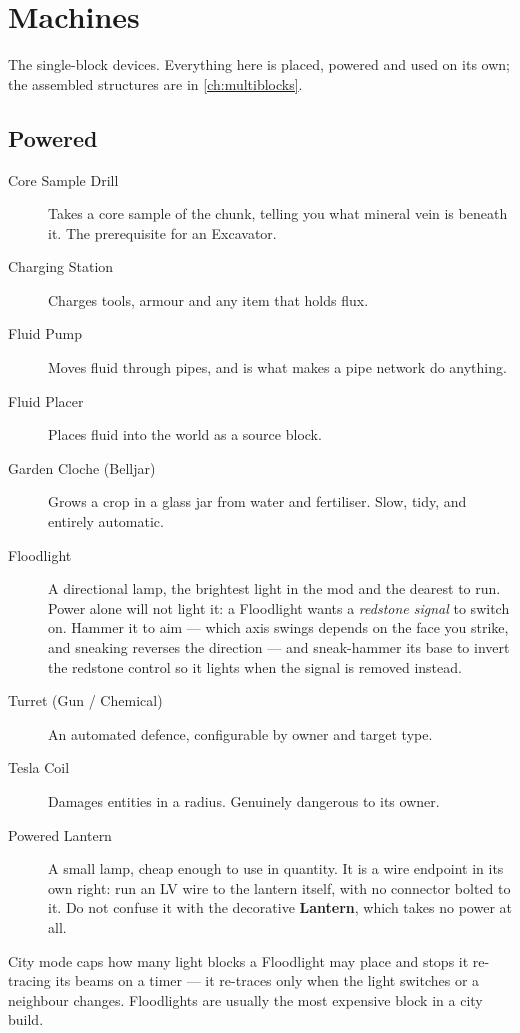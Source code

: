 \chapter{Machines}
\label{ch:machines}

The single-block devices. Everything here is placed, powered and used on its own; the assembled
structures are in \autoref{ch:multiblocks}.

\section{Powered}

\begin{description}
\item[Core Sample Drill] Takes a core sample of the chunk, telling you what mineral vein is beneath
      it. The prerequisite for an Excavator.
\item[Charging Station] Charges tools, armour and any item that holds flux.
\item[Fluid Pump] Moves fluid through pipes, and is what makes a pipe network do anything.
\item[Fluid Placer] Places fluid into the world as a source block.
\item[Garden Cloche (Belljar)] Grows a crop in a glass jar from water and fertiliser. Slow, tidy,
      and entirely automatic.
\item[Floodlight] A directional lamp, the brightest light in the mod and the dearest to run. Power
      alone will not light it: a Floodlight wants a \emph{redstone signal} to switch on. Hammer it
      to aim --- which axis swings depends on the face you strike, and sneaking reverses the
      direction --- and sneak-hammer its base to invert the redstone control so it lights when the
      signal is removed instead.
\item[Turret (Gun / Chemical)] An automated defence, configurable by owner and target type.
\item[Tesla Coil] Damages entities in a radius. Genuinely dangerous to its owner.
\item[Powered Lantern] A small lamp, cheap enough to use in quantity. It is a wire endpoint in its
      own right: run an LV wire to the lantern itself, with no connector bolted to it. Do not
      confuse it with the decorative \textbf{Lantern}, which takes no power at all.
\end{description}

\begin{iefork}
City mode caps how many light blocks a Floodlight may place and stops it re-tracing its beams on a
timer --- it re-traces only when the light switches or a neighbour changes. Floodlights are usually
the most expensive block in a city build.
\end{iefork}

